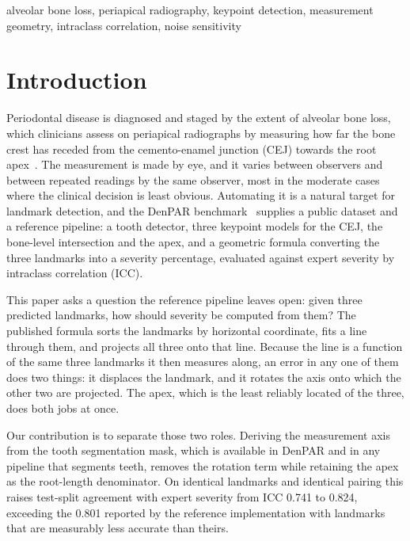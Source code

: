 \documentclass[conference]{IEEEtran}
\begin{document}
\begin{IEEEkeywords}
alveolar bone loss, periapical radiography, keypoint detection, measurement geometry, intraclass correlation, noise sensitivity
\end{IEEEkeywords}

\section{Introduction}
\label{sec:intro}

Periodontal disease is diagnosed and staged by the extent of alveolar bone loss, which clinicians assess on periapical radiographs by measuring how far the bone crest has receded from the cemento-enamel junction (CEJ) towards the root apex~\cite{armitage2004periodontal_radiography,papageorgiou2021periodontal}. The measurement is made by eye, and it varies between observers and between repeated readings by the same observer, most in the moderate cases where the clinical decision is least obvious. Automating it is a natural target for landmark detection, and the DenPAR benchmark~\cite{denpar2026} supplies a public dataset and a reference pipeline: a tooth detector, three keypoint models for the CEJ, the bone-level intersection and the apex, and a geometric formula converting the three landmarks into a severity percentage, evaluated against expert severity by intraclass correlation (ICC).

This paper asks a question the reference pipeline leaves open: given three predicted landmarks, how should severity be computed from them? The published formula sorts the landmarks by horizontal coordinate, fits a line through them, and projects all three onto that line. Because the line is a function of the same three landmarks it then measures along, an error in any one of them does two things: it displaces the landmark, and it rotates the axis onto which the other two are projected. The apex, which is the least reliably located of the three, does both jobs at once.

Our contribution is to separate those two roles. Deriving the measurement axis from the tooth segmentation mask, which is available in DenPAR and in any pipeline that segments teeth, removes the rotation term while retaining the apex as the root-length denominator. On identical landmarks and identical pairing this raises test-split agreement with expert severity from ICC 0.741 to 0.824, exceeding the 0.801 reported by the reference implementation with landmarks that are measurably less accurate than theirs.
\end{document}
